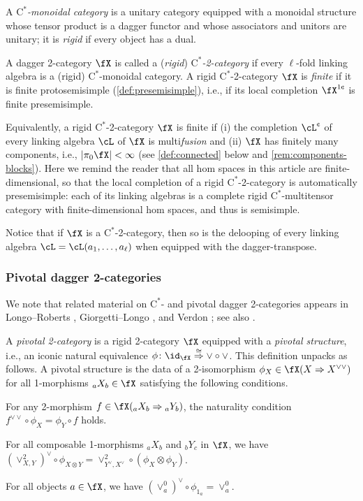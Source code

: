 \documentclass[12pt,reqno]{amsart}
\newcommand{\Cstar}{\ensuremath{\mathrm{C}^{*}}}
\newcommand{\defn}[1]{\emph{#1}}
\newcommand{\cent}{\textup{\textcent}}
\begin{document}
A \defn{$\Cstar$-monoidal category} is a unitary category equipped with a monoidal structure whose tensor product is a dagger functor and whose associators and unitors are unitary; it is \defn{rigid} if every object has a dual.

\begin{definition}\label{def:Cstar-2-cat}
  A dagger 2-category $\fX$ is called a (\defn{rigid}) \defn{$\Cstar$-2-category} if every $\ell$-fold linking algebra is a (rigid) $\Cstar$-monoidal category. A rigid $\Cstar$-2-category $\fX$ is \defn{finite} if it is finite protosemisimple (\cref{def:presemisimple}), i.e., if its local completion $\fX^{1\cent}$ is finite presemisimple.

Equivalently, a rigid $\Cstar$-2-category $\fX$ is finite if (i) the completion $\cL^\cent$ of every linking algebra $\cL$ of $\fX$ is multi\emph{fusion} and (ii) $\fX$ has finitely many components, i.e., $|\pi_0\fX|<\infty$ (see \cref{def:connected} below and \cref{rem:components-blocks}). Here we remind the reader that all hom spaces in this article are finite-dimensional, so that the local completion of a rigid $\Cstar$-2-category is automatically presemisimple: each of its linking algebras is a complete rigid $\Cstar$-multitensor category with finite-dimensional hom spaces, and thus is semisimple.
\end{definition}

Notice that if $\fX$ is a $\Cstar$-2-category, then so is the delooping of every linking algebra $\cL=\cL(a_1,\dots,a_\ell)$ when equipped with the dagger-transpose.

\subsubsection{Pivotal dagger 2-categories}
\label{sec:pivotal 2-category}

We note that related material on $\Cstar$- and pivotal dagger 2-categories appears in Longo--Roberts \cite{LR97}, Giorgetti--Longo \cite{GL19}, and Verdon \cite{V20}; see also \cite{Pen20,3Hilb}.

A \defn{pivotal 2-category} is a rigid 2-category $\fX$ equipped with a \defn{pivotal structure}, i.e., an iconic natural equivalence $\phi\colon\id_\fX\overset\cong\Rightarrow \vee\circ\vee$. This definition unpacks as follows. A pivotal structure is the data of a 2-isomorphism $\phi_X\in\fX(X\Rightarrow X^{\vee\vee})$ for all 1-morphisms ${}_aX_b\in\fX$ satisfying the following conditions.
\begin{lst} 
\item[(C$\phi$N)]\label{CphiN} For any 2-morphism $f\in\fX({}_aX_b\Rightarrow{}_aY_b)$, the naturality condition $f^{\vee\vee}\circ\phi_X=\phi_Y\circ f$ holds.
\item[(C$\phi\otimes$)] For all composable 1-morphisms ${}_aX_b$ and ${}_bY_c$ in $\fX$, we have $(\vee^2_{X,Y})^\vee\circ \phi_{X\otimes Y}=\vee^2_{Y^\vee,X^\vee}\circ(\phi_X\otimes\phi_Y)$.
\item[(C$\phi u$)]\label{Cphiu} For all objects $a\in\fX$, we have $(\vee^0_a)^\vee\circ\phi_{1_a}=\vee^0_a$.
\end{lst} 
\end{document}
